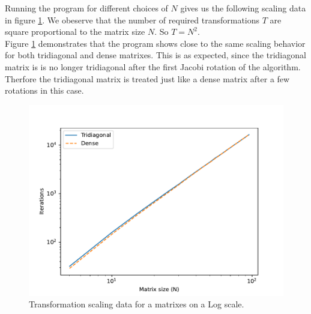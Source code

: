\documentclass[english,notitlepage]{revtex4-1}  %
\begin{document}
Running the program for different choices of $N$
gives us the following scaling data in figure \ref{fig:N_iter_log_both}.
We obeserve that the number of required transformations $T$ are 
square proportional to the matrix size $N$. So $T = N^2$. \\

Figure \ref{fig:N_iter_log_both} demonstrates that the program shows close to
the same scaling behavior for both tridiagonal and dense matrixes. 
This is as expected, since the tridiagonal matrix is is 
no longer tridiagonal after the first Jacobi rotation of the algorithm. 
Therfore the tridiagonal matrix is treated just like a dense matrix after a few
rotations in this case.

\begin{figure}[H]
    \centering
    \includegraphics[width=1.\textwidth]{../figures/N_iter_log_both.pdf}
    \caption{Transformation scaling data for a matrixes on a Log scale.}
    \label{fig:N_iter_log_both}
\end{figure}


\newpage
\end{document}
